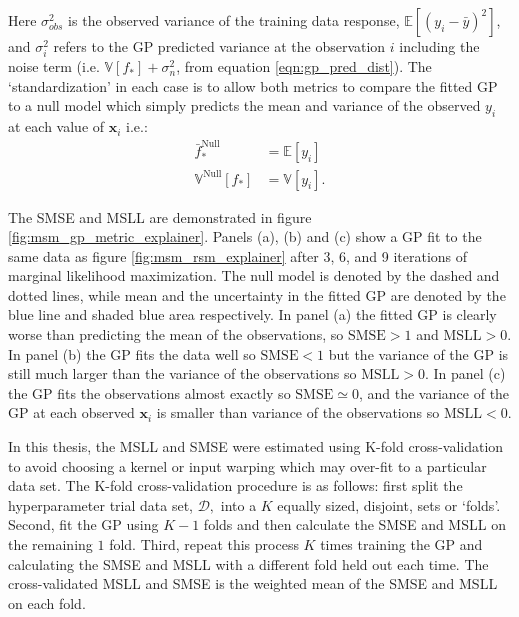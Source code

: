 Here $\sigma_{obs}^{2}$ is the observed variance of the training data response, $\mathbb{E}\left[(y_{i}-\bar{y})^{2}\right]$, and $\sigma_{i}^{2}$ refers to the GP predicted variance at the observation $i$ including the noise term (i.e. $\mathbb{V}\left[f_{*}\right]+\sigma_{n}^{2}$, from equation \ref{eqn:gp_pred_dist}).  The `standardization' in each case is to allow both metrics to compare the fitted GP to a null model which simply predicts the mean and variance of the observed $y_{i}$ at each value of $\mathbf{x}_{i}$ i.e.:\cite{rasmussenGaussianProcessesMachine2006}
\begin{equation}\label{eqn:gp_null}
\begin{aligned}
\bar{f}^{\mathrm{Null}}_{*} &= \mathbb{E}\left[y_{i}\right] \\
\mathbb{V}^{\mathrm{Null}}\left[f_{*}\right] &= \mathbb{V}\left[y_{i}\right].
\end{aligned}
\end{equation}

The SMSE and MSLL are demonstrated in figure \ref{fig:msm_gp_metric_explainer}. Panels (a), (b) and (c) show a GP fit to the same data as figure \ref{fig:msm_rsm_explainer} after 3, 6, and 9 iterations of marginal likelihood maximization. The null model is denoted by the dashed and dotted lines, while mean and the uncertainty in the fitted GP are denoted by the blue line and shaded blue area respectively.  In panel (a) the fitted GP is clearly worse than predicting the mean of the observations, so  $\mathrm{SMSE} > 1$ and  $\mathrm{MSLL} > 0$. In panel (b) the GP fits the data well so $\mathrm{SMSE} < 1$ but the variance of the GP is still much larger than the variance of the observations so $\mathrm{MSLL} > 0$. In panel (c) the GP fits the observations almost exactly so $\mathrm{SMSE} \simeq 0$, and the variance of the GP at each observed $\mathbf{x}_{i}$ is smaller than variance of the observations so $\mathrm{MSLL} < 0$. 

In this thesis, the MSLL and SMSE were estimated using K-fold cross-validation \cite{friedman2001elements} to avoid choosing a kernel or input warping which may over-fit to a particular data set. The K-fold cross-validation procedure is as follows\cite{friedman2001elements}: first split the hyperparameter trial data set, $\mathcal{D},$ into a $K$ equally sized, disjoint, sets or `folds'. Second, fit the GP using $K-1$ folds and then calculate the SMSE and MSLL on the remaining $1$ fold. Third, repeat this process $K$ times training the GP and calculating the SMSE and MSLL with a different fold held out each time. The cross-validated MSLL and SMSE is the weighted mean of the SMSE and MSLL on each fold. 

